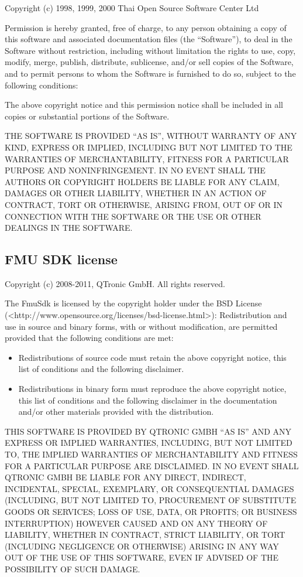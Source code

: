 Copyright (c) 1998, 1999, 2000 Thai Open Source Software Center Ltd

Permission is hereby granted, free of charge, to any person obtaining a copy of this software and associated documentation files (the ``Software''), to deal in the Software without restriction, including without limitation the rights to use, copy, modify, merge, publish, distribute, sublicense, and/or sell copies of the Software, and to permit persons to whom the Software is furnished to do so, subject to the following conditions:

The above copyright notice and this permission notice shall be included in all copies or substantial portions of the Software.

THE SOFTWARE IS PROVIDED ``AS IS'', WITHOUT WARRANTY OF ANY KIND, EXPRESS OR IMPLIED, INCLUDING BUT NOT LIMITED TO THE WARRANTIES OF MERCHANTABILITY, FITNESS FOR A PARTICULAR PURPOSE AND NONINFRINGEMENT. IN NO EVENT SHALL THE AUTHORS OR COPYRIGHT HOLDERS BE LIABLE FOR ANY CLAIM, DAMAGES OR OTHER LIABILITY, WHETHER IN AN ACTION OF CONTRACT, TORT OR OTHERWISE, ARISING FROM, OUT OF OR IN CONNECTION WITH THE SOFTWARE OR THE USE OR OTHER DEALINGS IN THE SOFTWARE.

\subsection{FMU SDK license}\label{fmu-sdk-license}

Copyright (c) 2008-2011, QTronic GmbH. All rights reserved.

The FmuSdk is licensed by the copyright holder under the BSD License (\textless{}http://www.opensource.org/licenses/bsd-license.html\textgreater{}): Redistribution and use in source and binary forms, with or without modification, are permitted provided that the following conditions are met:

\begin{itemize}
\item
  Redistributions of source code must retain the above copyright notice, this list of conditions and the following disclaimer.
\item
  Redistributions in binary form must reproduce the above copyright notice, this list of conditions and the following disclaimer in the documentation and/or other materials provided with the distribution.
\end{itemize}

THIS SOFTWARE IS PROVIDED BY QTRONIC GMBH ``AS IS'' AND ANY EXPRESS OR IMPLIED WARRANTIES, INCLUDING, BUT NOT LIMITED TO, THE IMPLIED WARRANTIES OF MERCHANTABILITY AND FITNESS FOR A PARTICULAR PURPOSE ARE DISCLAIMED. IN NO EVENT SHALL QTRONIC GMBH BE LIABLE FOR ANY DIRECT, INDIRECT, INCIDENTAL, SPECIAL, EXEMPLARY, OR CONSEQUENTIAL DAMAGES (INCLUDING, BUT NOT LIMITED TO, PROCUREMENT OF SUBSTITUTE GOODS OR SERVICES; LOSS OF USE, DATA, OR PROFITS; OR BUSINESS INTERRUPTION) HOWEVER CAUSED AND ON ANY THEORY OF LIABILITY, WHETHER IN CONTRACT, STRICT LIABILITY, OR TORT (INCLUDING NEGLIGENCE OR OTHERWISE) ARISING IN ANY WAY OUT OF THE USE OF THIS SOFTWARE, EVEN IF ADVISED OF THE POSSIBILITY OF SUCH DAMAGE.

